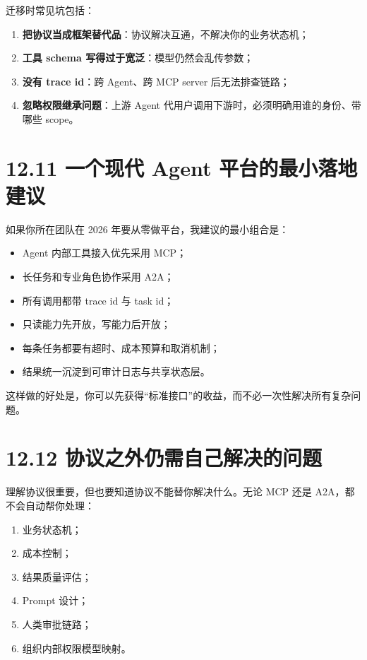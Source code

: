 迁移时常见坑包括：


\begin{enumerate}[leftmargin=2em]
\item \textbf{把协议当成框架替代品}：协议解决互通，不解决你的业务状态机；
\item \textbf{工具 schema 写得过于宽泛}：模型仍然会乱传参数；
\item \textbf{没有 trace id}：跨 Agent、跨 MCP server 后无法排查链路；
\item \textbf{忽略权限继承问题}：上游 Agent 代用户调用下游时，必须明确用谁的身份、带哪些 scope。
\end{enumerate}

\section{12.11 一个现代 Agent 平台的最小落地建议}

如果你所在团队在 2026 年要从零做平台，我建议的最小组合是：


\begin{itemize}[leftmargin=2em]
\item Agent 内部工具接入优先采用 MCP；
\item 长任务和专业角色协作采用 A2A；
\item 所有调用都带 trace id 与 task id；
\item 只读能力先开放，写能力后开放；
\item 每条任务都要有超时、成本预算和取消机制；
\item 结果统一沉淀到可审计日志与共享状态层。
\end{itemize}

这样做的好处是，你可以先获得``标准接口''的收益，而不必一次性解决所有复杂问题。


\section{12.12 协议之外仍需自己解决的问题}

理解协议很重要，但也要知道协议不能替你解决什么。无论 MCP 还是 A2A，都不会自动帮你处理：


\begin{enumerate}[leftmargin=2em]
\item 业务状态机；
\item 成本控制；
\item 结果质量评估；
\item Prompt 设计；
\item 人类审批链路；
\item 组织内部权限模型映射。
\end{enumerate}

